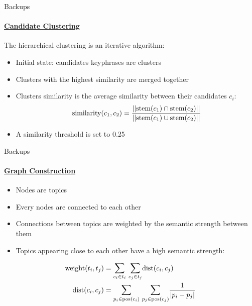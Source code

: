   \begin{frame}[label=candidate_clustering_backup]{Backups}
    \framesubtitle{\hyperlink{topicrank}{Candidate Clustering}}

    The hierarchical clustering is an iterative algorithm:
    \begin{itemize}
      \item{Initial state: candidates keyphrases are clusters}
      \item{Clusters with the highest similarity are merged together}
      \item{Clusters similarity is the average similarity between their
            candidates $c_i$:}
      \begin{align}
        \text{similarity}(c_1, c_2) = \frac{||\text{stem}(c_1) \cap \text{stem}(c_2)||}{||\text{stem}(c_1)  \cup \text{stem}(c_2)||} \notag
      \end{align}
      \item{A similarity threshold is set to 0.25}
    \end{itemize}
  \end{frame}

  \begin{frame}[label=graph_construction_backup]{Backups}
    \framesubtitle{\hyperlink{topicrank}{Graph Construction}}

    \begin{itemize}
      \item{Nodes are topics}
      \item{Every nodes are connected to each other}
      \item{Connections between topics are weighted by the semantic strength
            between them}
      \item{Topics appearing close to each other have a high semantic strength:}
    \end{itemize}

    \begin{small}
      \begin{align}
        \text{weight}(t_i, t_j) &= \mathlarger{\sum}_{c_i \in t_i}\ \mathlarger{\sum}_{c_j \in t_j} \text{dist}(c_i, c_j) \notag\\
        \text{dist}(c_i, c_j) &= \mathlarger{\sum}_{p_i \in \text{pos}(c_i)}\ \mathlarger{\sum}_{p_j \in \text{pos}(c_j)} \frac{1}{|p_i - p_j|} \notag
      \end{align}
    \end{small}
  \end{frame}

